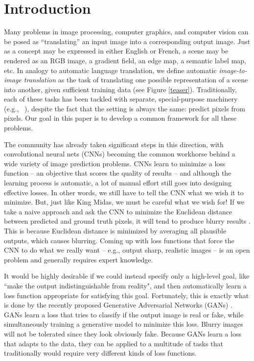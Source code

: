 \documentclass[10pt,twocolumn,letterpaper]{article}
\begin{document}
\vspace{-1mm}
\section{Introduction}
\vspace{-1mm}
Many problems in image processing, computer graphics, and computer vision can be posed as ``translating'' an input image into a corresponding output image. Just as a concept may be expressed in either English or French, a scene may be rendered as an RGB image, a gradient field, an edge map, a semantic label map, etc. In analogy to automatic language translation, we define automatic \emph{image-to-image translation} as the task of translating one possible representation of a scene into another, given sufficient training data (see Figure \ref{teaser}).
Traditionally, each of these tasks has been tackled with separate, special-purpose machinery (e.g., ~\cite{efros2001image, hertzmann2001image, fergus2006removing, buades2005non, chen2009sketch2photo, shih2013data, laffont2014transient, long2015fully, eigen2015predicting, xie2015holistically, zhang2016colorful}), despite the fact that the setting is always the same: predict pixels from pixels. Our goal in this paper is to develop a common framework for all these problems.

The community has already taken significant steps in this direction, with convolutional neural nets (CNNs) becoming the common workhorse behind a wide variety of image prediction problems. CNNs learn to minimize a loss function -- an objective that scores the quality of results -- and although the learning process is automatic, a lot of manual effort still goes into designing effective losses. In other words, we still have to tell the CNN what we wish it to minimize. But, just like King Midas, we must be careful what we wish for! If we take a naive approach and ask the CNN to minimize the Euclidean distance between predicted and ground truth pixels, it will tend to produce blurry results \cite{pathak2016context, zhang2016colorful}. This is because Euclidean distance is minimized by averaging all plausible outputs, which causes blurring. Coming up with loss functions that force the CNN to do what we really want -- e.g., output sharp, realistic images -- is an open problem and generally requires expert knowledge.

It would be highly desirable if we could instead specify only a high-level goal, like ``make the output indistinguishable from reality", and then automatically learn a loss function appropriate for satisfying this goal. Fortunately, this is exactly what is done by the recently proposed Generative Adversarial Networks (GANs) \cite{goodfellow2014generative, denton2015deep, radford2015unsupervised, salimans2016improved, zhao2016energy}. GANs learn a loss that tries to classify if the output image is real or fake, while simultaneously training a generative model to minimize this loss. Blurry images will not be tolerated since they look obviously fake. Because GANs learn a loss that adapts to the data, they can be applied to a multitude of tasks that traditionally would require very different kinds of loss functions.
\end{document}
